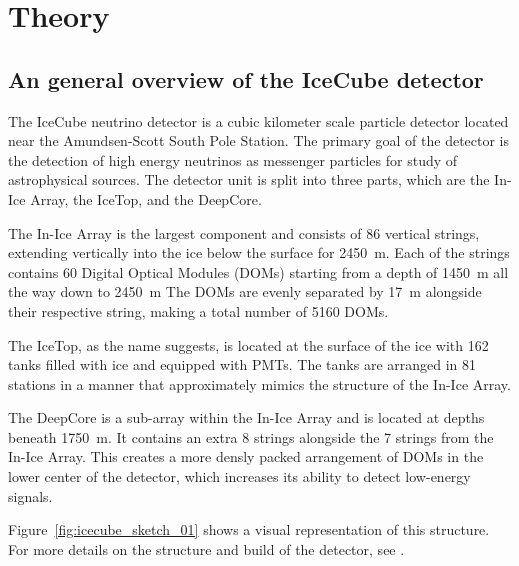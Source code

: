 \chapter{Theory}

\section{An general overview of the IceCube detector}
The IceCube neutrino detector is a cubic kilometer scale particle detector located near the Amundsen-Scott South Pole Station. The primary goal of 
the detector is the detection of high energy neutrinos as messenger particles for study of astrophysical sources. The detector unit is split into three 
parts, which are the In-Ice Array, the IceTop, and the DeepCore. 

The In-Ice Array is the largest component and consists of 86 vertical strings, extending vertically into the ice below the surface for \SI{2450}{\metre}. 
Each of the strings contains 60 Digital Optical Modules (DOMs) starting from a depth of \SI{1450}{\metre} all the way down to \SI{2450}{\metre}
The DOMs are evenly separated by \SI{17}{\metre} alongside their respective string, making a total number of \num{5160} DOMs. 

The IceTop, as the name suggests, is located at the surface of the ice with \num{162} tanks filled with ice and equipped with PMTs. 
The tanks are arranged in 81 stations in a manner that approximately mimics the structure of the In-Ice Array. 

The DeepCore is a sub-array within the In-Ice Array and is located at depths beneath \SI{1750}{\metre}. It contains an extra \num{8} strings alongside the 
\num{7} strings from the In-Ice Array. This creates a more densly packed arrangement of DOMs in the lower center of the detector, which increases its 
ability to detect low-energy signals.

Figure~\ref{fig:icecube_sketch_01} shows a visual representation of this structure. For more details on the structure and build of the detector, see \cite{einstein}.

